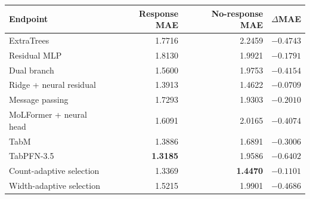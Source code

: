 \begin{longtable}{@{}p{5.4cm}rrr@{}}
\toprule
Endpoint & Response MAE & No-response MAE & $\Delta$MAE \\
\midrule
\endhead
ExtraTrees & 1.7716 & 2.2459 & $-0.4743$ \\
Residual MLP & 1.8130 & 1.9921 & $-0.1791$ \\
Dual branch & 1.5600 & 1.9753 & $-0.4154$ \\
Ridge + neural residual & 1.3913 & 1.4622 & $-0.0709$ \\
Message passing & 1.7293 & 1.9303 & $-0.2010$ \\
MoLFormer + neural head & 1.6091 & 2.0165 & $-0.4074$ \\
TabM & 1.3886 & 1.6891 & $-0.3006$ \\
TabPFN-3.5 & \textbf{1.3185} & 1.9586 & $\mathbf{-0.6402}$ \\
Count-adaptive selection & 1.3369 & \textbf{1.4470} & $-0.1101$ \\
Width-adaptive selection & 1.5215 & 1.9901 & $-0.4686$ \\
\bottomrule\end{longtable}
